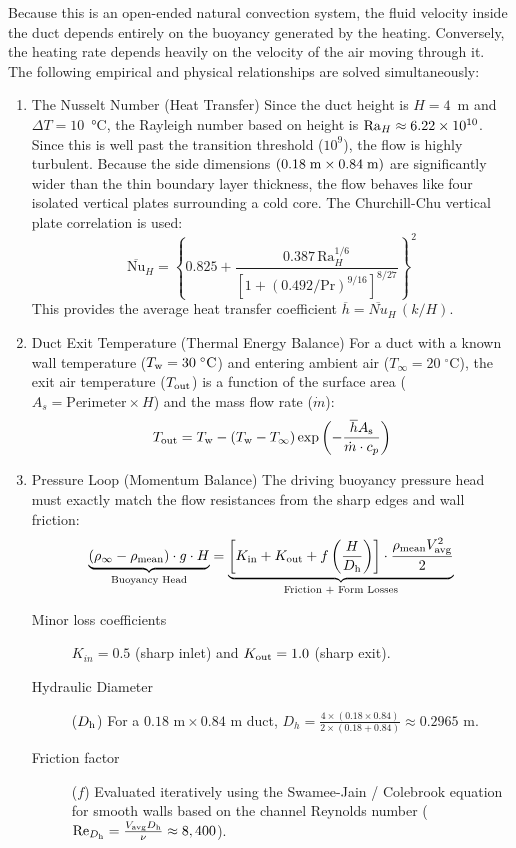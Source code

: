 \documentclass[11pt]{book}
\begin{document}
Because this is an open-ended natural convection system, the fluid velocity inside the duct depends entirely on the buoyancy generated by the heating. Conversely, the heating rate depends heavily on the velocity of the air moving through it. The following empirical and physical relationships are solved simultaneously:
\begin{enumerate}
\item The Nusselt Number (Heat Transfer)
Since the duct height is $H=4$~m and $\Delta T = 10$~\unit{\degreeCelsius}, the Rayleigh number based on height is ${\rm Ra}_H \approx 6.22 \times 10^{10}$. Since this is well past the transition threshold ($10^9$), the flow is highly turbulent. Because the side dimensions $(0.18\;{\rm m} \times 0.84\;{\rm m})$ are significantly wider than the thin boundary layer thickness, the flow behaves like four isolated vertical plates surrounding a cold core. The Churchill-Chu vertical plate correlation is used:
\begin{equation}
\overline{\text{Nu}}_{H}=\left\{0.825+\frac{0.387\,\text{Ra}_{H}^{1/6}}{\left[1+(0.492/\text{Pr})^{9/16}\right]^{8/27}}\right\}^{2}
\end{equation}
This provides the average heat transfer coefficient $\overline{h} = \overline{Nu}_H \, (k/H)$.
\item Duct Exit Temperature (Thermal Energy Balance)
For a duct with a known wall temperature ($T_{\rm w} = 30\;^\circ\text{C}$) and entering ambient air ($T_\infty = 20\;^\circ\text{C}$), the exit air temperature ($T_{\rm out}$) is a function of the surface area ($A_s = \text{Perimeter} \times H$) and the mass flow rate ($\dot{m}$):
\begin{equation}
T_{\rm out}=T_{\rm w}-(T_{\rm w}-T_{\infty })\exp \left(-\frac{\overline{h}A_{\rm s}}{\dot{m}\cdot c_{p}}\right)
\end{equation}
\item Pressure Loop (Momentum Balance)
The driving buoyancy pressure head must exactly match the flow resistances from the sharp edges and wall friction:
\begin{equation}
\underbrace{(\rho _{\infty }-\rho _{\rm mean})\cdot g\cdot H}_{\text{Buoyancy Head}}=\underbrace{\left[K_{\rm in}+K_{\rm out}+f\left(\frac{H}{D_{\rm h}}\right)\right]\cdot \frac{\rho _{\rm mean}V_{\rm avg}^{2}}{2}}_{\text{Friction + Form Losses}}
\end{equation}
\begin{description}
\item[Minor loss coefficients] $K_{in} = 0.5$ (sharp inlet) and $K_{\rm out} = 1.0$ (sharp exit).
\item[Hydraulic Diameter] ($D_{\rm h}$) For a $0.18\text{ m} \times 0.84\text{ m}$ duct, $D_h = \frac{4 \times (0.18 \times 0.84)}{2 \times (0.18 + 0.84)} \approx 0.2965\text{ m}$.
\item[Friction factor] ($f$) Evaluated iteratively using the Swamee-Jain / Colebrook equation for smooth walls based on the channel Reynolds number ($\text{Re}_{D_{\rm h}} = \frac{V_{\rm avg} D_{\rm h}}{\nu} \approx 8,400$).
\end{description}
\end{enumerate}
\end{document}
